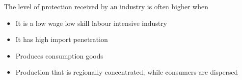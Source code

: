 \documentclass{beamer}
\begin{document}
\begin{frame}
  The level of protection received by an industry is often higher when
  \begin{itemize}
    \item It is a low wage low skill labour intensive industry
    \item It has high import penetration
    \item Produces consumption goods
    \item Production that is regionally concentrated, while consumers are dispersed
  \end{itemize}
\end{frame}


\end{document}
